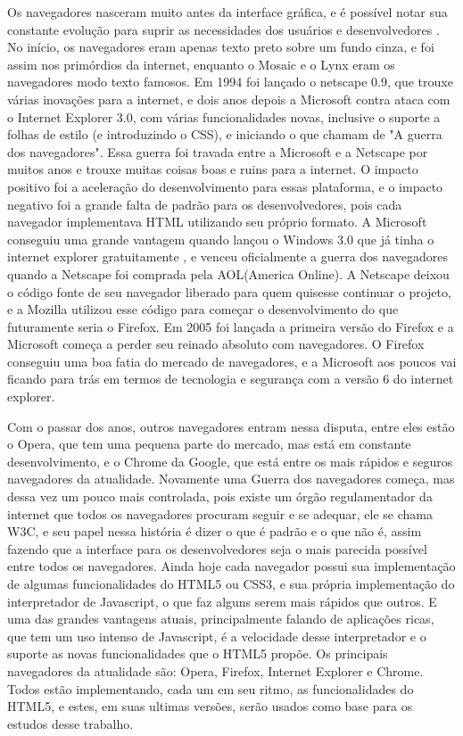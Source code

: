 Os navegadores nasceram muito antes da interface gráfica,
e é possível notar sua constante evolução para suprir as necessidades
dos usuários e desenvolvedores \cite{robbins2006web}. No início, os
navegadores eram apenas texto preto sobre um fundo cinza, e foi assim
nos primórdios da internet, enquanto o Mosaic e o Lynx eram os
navegadores modo texto famosos. Em 1994 foi lançado o netscape 0.9, que
trouxe várias inovações para a internet, e dois anos depois a
Microsoft contra ataca com o Internet Explorer 3.0, com várias
funcionalidades novas, inclusive o suporte a folhas de estilo (e
introduzindo o CSS), e iniciando o que chamam de "A guerra dos
navegadores". Essa guerra foi travada entre a Microsoft e a Netscape
por muitos anos e trouxe muitas coisas boas e ruins para a internet. O
impacto positivo foi a aceleração do desenvolvimento para essas
plataforma, e o impacto negativo foi a grande falta de padrão para os
desenvolvedores, pois cada navegador implementava HTML utilizando seu
próprio formato. A Microsoft conseguiu uma grande vantagem quando lançou
o Windows 3.0 que já tinha o internet explorer gratuitamente
\cite{asleson2006foundations}, e venceu oficialmente a guerra dos navegadores quando a
Netscape foi comprada pela AOL(America Online). A Netscape deixou o código fonte
de seu navegador liberado para quem quisesse continuar o projeto,
e a Mozilla utilizou esse código para começar o desenvolvimento
do que futuramente seria o Firefox.
Em 2005 foi lançada a primeira versão do Firefox e a Microsoft começa
a perder seu reinado absoluto com navegadores. O Firefox conseguiu uma
boa fatia do mercado de navegadores, e a Microsoft aos poucos vai
ficando para trás em termos de tecnologia e segurança com a versão 6
do internet explorer.

Com o passar dos anos, outros navegadores entram nessa disputa, entre
eles estão o Opera, que tem uma pequena parte do mercado, mas está em
constante desenvolvimento, e o Chrome da Google, que está entre os
mais rápidos e seguros navegadores da atualidade.
Novamente uma Guerra dos navegadores começa, mas dessa vez um pouco
mais controlada, pois existe um órgão regulamentador da internet que
todos os navegadores procuram seguir e se adequar, ele se chama W3C,
e seu papel nessa história é dizer o que
é padrão e o que não é, assim fazendo que a interface para os
desenvolvedores seja o mais parecida possível entre todos os
navegadores.
Ainda hoje cada navegador possui sua implementação de algumas
funcionalidades do HTML5 ou CSS3, e sua própria implementação do
interpretador de Javascript, o que faz alguns serem mais rápidos que
outros. E uma das grandes vantagens atuais, principalmente falando de
aplicações ricas, que tem um uso intenso de Javascript, é a velocidade
desse interpretador e o suporte as novas funcionalidades que o HTML5
propõe.
Os principais navegadores da atualidade são: Opera, Firefox, Internet
Explorer e Chrome. Todos estão implementando, cada um em seu ritmo, as
funcionalidades do HTML5, e estes, em suas ultimas versões, serão usados
como base para os estudos desse trabalho.
